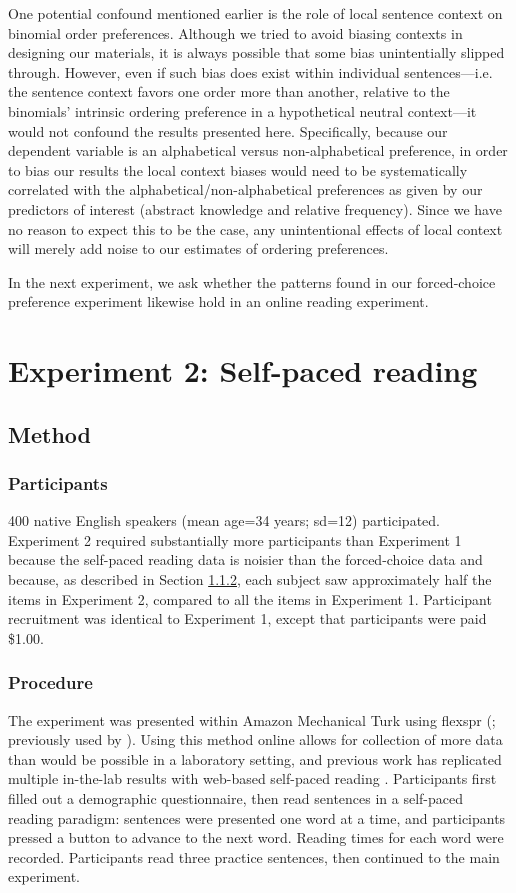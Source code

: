 \documentclass[authoryear]{elsarticle}
\begin{document}
One potential confound mentioned earlier is the role of local sentence context on binomial order preferences. Although we tried to avoid biasing contexts in designing our materials, it is always possible that some bias unintentially slipped through. However, even if such bias does exist within individual sentences---i.e. the sentence context favors one order more than another, relative to the binomials' intrinsic ordering preference in a hypothetical neutral context---it would not confound the results presented here. Specifically, because our dependent variable is an alphabetical versus non-alphabetical preference, in order to bias our results the local context biases would need to be systematically correlated with the alphabetical/non-alphabetical preferences as given by our predictors of interest (abstract knowledge and relative frequency). Since we have no reason to expect this to be the case, any unintentional effects of local context will merely add noise to our estimates of ordering preferences.

In the next experiment, we ask whether the patterns found in our forced-choice preference experiment likewise hold in an online reading experiment.


\section{Experiment 2: Self-paced reading}\label{expt2}
\subsection{Method}
\subsubsection{Participants}
400 native English speakers (mean age=34 years; sd=12) participated. Experiment 2 required substantially more participants than Experiment 1 because the self-paced reading data is noisier than the forced-choice data and because, as described in Section \ref{expt2-procedure}, each subject saw approximately half the items in Experiment 2, compared to all the items in Experiment 1. Participant recruitment was identical to Experiment 1, except that participants were paid \$1.00.

\subsubsection{Procedure}\label{expt2-procedure}
The experiment was presented within Amazon Mechanical Turk using flexspr (\citealp{flexspr:cFpvxjkw}; previously used by \citealp{Bergen:2012ur,Linzen:2015jb,Singh:2015uf}). Using this method online allows for collection of more data than would be possible in a laboratory setting, and previous work has replicated multiple in-the-lab results with web-based self-paced reading \citep{Enochson:2015dy}. Participants first filled out a demographic questionnaire, then read sentences in a self-paced reading paradigm: sentences were presented one word at a time, and participants pressed a button to advance to the next word. Reading times for each word were recorded. Participants read three practice sentences, then continued to the main experiment.
\end{document}
